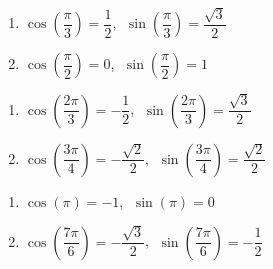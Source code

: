 \documentclass{ximera}
\begin{document}
\begin{multicols}{2}

\begin{enumerate}

\setcounter{enumi}{\value{HW}}

\item $\cos \left(\dfrac{\pi}{3}\right) = \dfrac{1}{2}$, $\; \sin \left(\dfrac{\pi}{3}\right) = \dfrac{\sqrt{3}}{2}$

\item $\cos \left(\dfrac{\pi}{2}\right) = 0$, $\; \sin \left(\dfrac{\pi}{2}\right) = 1$ 

\setcounter{HW}{\value{enumi}}

\end{enumerate}

\end{multicols}

\begin{multicols}{2}

\begin{enumerate}

\setcounter{enumi}{\value{HW}}

\item $\cos\left(\dfrac{2\pi}{3}\right) = -\dfrac{1}{2}$, $\; \sin \left(\dfrac{2\pi}{3}\right) = \dfrac{\sqrt{3}}{2}$

\item $\cos \left(\dfrac{3\pi}{4} \right) = -\dfrac{\sqrt{2}}{2}$, $\; \sin \left(\dfrac{3\pi}{4} \right) = \dfrac{\sqrt{2}}{2}$

\setcounter{HW}{\value{enumi}}

\end{enumerate}

\end{multicols}

\begin{multicols}{2}

\begin{enumerate}

\setcounter{enumi}{\value{HW}}

\item $\cos(\pi) = -1$, $\; \sin(\pi) = 0$ 

\item $\cos\left(\dfrac{7\pi}{6}\right) = -\dfrac{\sqrt{3}}{2}$, $\; \sin\left(\dfrac{7\pi}{6}\right) = -\dfrac{1}{2}$

\setcounter{HW}{\value{enumi}}

\end{enumerate}

\end{multicols}
\end{document}
